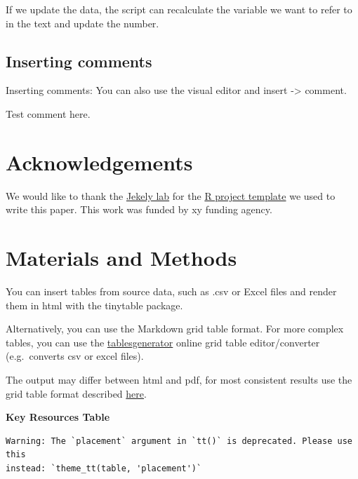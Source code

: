 \documentclass[
  11pt,
]{article}
\begin{document}
If we update the data, the script can recalculate the variable we want
to refer to in the text and update the number.

\subsection{Inserting comments}\label{inserting-comments}

Inserting comments: You can also use the visual editor and insert
-\textgreater{} comment.

Test comment here.

\section{Acknowledgements}\label{acknowledgements}

We would like to thank the \href{https://github.com/JekelyLab}{Jekely
lab} for the \href{https://github.com/JekelyLab/new_paper_template}{R
project template} we used to write this paper. This work was funded by
xy funding agency.

\section{Materials and Methods}\label{materials-and-methods}

You can insert tables from source data, such as .csv or Excel files and
render them in html with the tinytable package.

Alternatively, you can use the Markdown grid table format. For more
complex tables, you can use the
\href{https://www.tablesgenerator.com/markdown_tables}{tablesgenerator}
online grid table editor/converter (e.g.~converts csv or excel files).

The output may differ between html and pdf, for most consistent results
use the grid table format described
\href{https://quarto.org/docs/authoring/tables.html}{here}.

\textbf{Key Resources Table}

\begin{verbatim}
Warning: The `placement` argument in `tt()` is deprecated. Please use this
instead: `theme_tt(table, 'placement')`
\end{verbatim}
\end{document}
